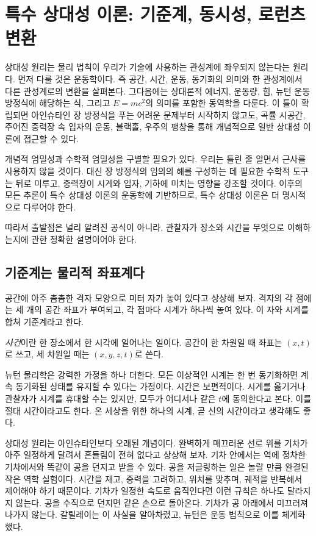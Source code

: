 \chapter{특수 상대성 이론: 기준계, 동시성, 로런츠 변환}

상대성 원리는 물리 법칙이 우리가 기술에 사용하는 관성계에 좌우되지 않는다는 원리다. 먼저 다룰 것은 운동학이다. 즉 공간, 시간, 운동, 동기화의 의미와 한 관성계에서 다른 관성계로의 변환을 살펴본다. 그다음에는 상대론적 에너지, 운동량, 힘, 뉴턴 운동 방정식에 해당하는 식, 그리고 \(E=mc^2\)의 의미를 포함한 동역학을 다룬다. 이 틀이 확립되면 아인슈타인 장 방정식을 푸는 어려운 문제부터 시작하지 않고도, 곡률 시공간, 주어진 중력장 속 입자의 운동, 블랙홀, 우주의 팽창을 통해 개념적으로 일반 상대성 이론에 접근할 수 있다.

개념적 엄밀성과 수학적 엄밀성을 구별할 필요가 있다. 우리는 틀린 줄 알면서 근사를 사용하지 않을 것이다. 대신 장 방정식의 임의의 해를 구성하는 데 필요한 수학적 도구는 뒤로 미루고, 중력장이 시계와 입자, 기하에 미치는 영향을 강조할 것이다. 이후의 모든 추론이 특수 상대성 이론의 운동학에 기반하므로, 특수 상대성 이론은 더 명시적으로 다루어야 한다.

따라서 출발점은 널리 알려진 공식이 아니라, 관찰자가 장소와 시간을 무엇으로 이해하는지에 관한 정확한 설명이어야 한다.

\section{기준계는 물리적 좌표계다}

공간에 아주 촘촘한 격자 모양으로 미터 자가 놓여 있다고 상상해 보자. 격자의 각 점에는 세 개의 공간 좌표가 부여되고, 각 점마다 시계가 하나씩 놓여 있다. 이 자와 시계를 합쳐 기준계라고 한다.

\begin{definition}
\emph{사건}이란 한 장소에서 한 시각에 일어나는 일이다. 공간이 한 차원일 때 좌표는 \((x,t)\)로 쓰고, 세 차원일 때는 \((x,y,z,t)\)로 쓴다.
\end{definition}

뉴턴 물리학은 강력한 가정을 하나 더한다. 모든 이상적인 시계는 한 번 동기화하면 계속 동기화된 상태를 유지할 수 있다는 가정이다. 시간은 보편적이다. 시계를 옮기거나 관찰자가 시계를 휴대할 수는 있지만, 모두가 어디서나 같은 \(t\)에 동의한다고 본다. 이를 절대 시간이라고도 한다. 온 세상을 위한 하나의 시계, 곧 신의 시간이라고 생각해도 좋다.

상대성 원리는 아인슈타인보다 오래된 개념이다. 완벽하게 매끄러운 선로 위를 기차가 아주 일정하게 달려서 흔들림이 전혀 없다고 상상해 보자. 기차 안에서는 역에 정차한 기차에서와 똑같이 공을 던지고 받을 수 있다. 공을 저글링하는 일은 놀랄 만큼 완결된 작은 역학 실험이다. 시간을 재고, 중력을 고려하고, 위치를 맞추며, 궤적을 반복해서 제어해야 하기 때문이다. 기차가 일정한 속도로 움직인다면 이런 규칙은 하나도 달라지지 않는다. 공을 수직으로 던지면 같은 손으로 돌아온다. 기차가 공 아래에서 미끄러져 나가지 않는다. 갈릴레이는 이 사실을 알아차렸고, 뉴턴은 운동 법칙으로 이를 체계화했다.


